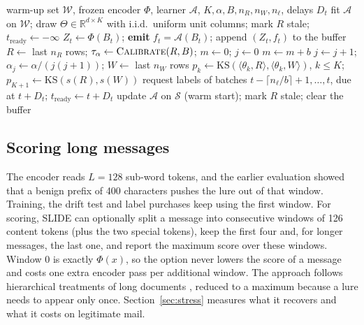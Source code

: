 \begin{algorithm}[t]
\caption{SLIDE: drift-triggered label acquisition}\label{alg:slide}
\small
\begin{algorithmic}[1]
\Require warm-up set $\mathcal{W}$, frozen encoder $\Phi$, learner $\mathcal{A}$, $K,\alpha,B,n_R,n_W,n_\ell$, delays $D_t$
\State fit $\mathcal{A}$ on $\mathcal{W}$; draw $\Theta\in\mathbb{R}^{d\times K}$ with i.i.d.\ uniform unit columns; mark $R$ stale; $t_{\mathrm{ready}}\gets-\infty$
  \State $Z_t\gets\Phi(B_t)$; \textbf{emit} $f_t=\mathcal{A}(B_t)$; append $(Z_t,f_t)$ to the buffer 
     $R\gets$ last $n_R$ rows; $\tau_\alpha\gets\textsc{Calibrate}(R,B)$; $m\gets0$; $j\gets0$ \EndIf
  \Else
    \State $m\gets m+b$
      \State $j\gets j+1$; $\alpha_j\gets\alpha/(j(j+1))$; $W\gets$ last $n_W$ rows
      \State $p_k\gets\mathrm{KS}(\langle\theta_k,R\rangle,\langle\theta_k,W\rangle)$, $k\le K$; $p_{K+1}\gets\mathrm{KS}(s(R),s(W))$
        \State request labels of batches $t-\lceil n_\ell/b\rceil+1,\dots,t$, due at $t+D_t$; $t_{\mathrm{ready}}\gets t+D_t$
      \EndIf
    \EndIf
  \EndIf
    \State update $\mathcal{A}$ on $\mathcal{S}$ (warm start); mark $R$ stale; clear the buffer
  \EndIf
\EndFor
\end{algorithmic}
\end{algorithm}

\subsection{Scoring long messages}\label{sec:chunk}
The encoder reads $L=128$ sub-word tokens, and the earlier evaluation showed that a benign prefix of 400 characters pushes the lure out of that window. Training, the drift test and label purchases keep using the first window. For scoring, SLIDE can optionally split a message into consecutive windows of 126 content tokens (plus the two special tokens), keep the first four and, for longer messages, the last one, and report the maximum score over these windows. Window 0 is exactly $\Phi(x)$, so the option never lowers the score of a message and costs one extra encoder pass per additional window. The approach follows hierarchical treatments of long documents \cite{pappagari2019}, reduced to a maximum because a lure needs to appear only once. Section~\ref{sec:stress} measures what it recovers and what it costs on legitimate mail.

